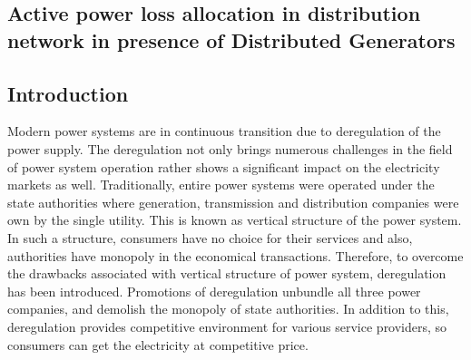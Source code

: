 \begin{spacing}{1.3}
	
\chapter{Active power loss allocation in distribution network in presence of Distributed Generators}%
\section{Introduction}
Modern power systems are in continuous transition due to deregulation of the power supply. The deregulation not only brings numerous challenges in the field of power system operation rather shows a significant impact on the electricity markets as well. Traditionally, entire power systems were operated under the state authorities where generation, transmission and distribution companies were own by the single utility. This is known as vertical structure of the power system. In such a structure, consumers have no choice for their services and also, authorities have monopoly in the economical transactions. Therefore, to overcome the drawbacks associated with vertical structure of power system, deregulation has been introduced. Promotions of deregulation unbundle all three power companies, and demolish the monopoly of state authorities. In addition to this, deregulation provides competitive environment for various service providers, so consumers can get the electricity at competitive price. 
\end{spacing}